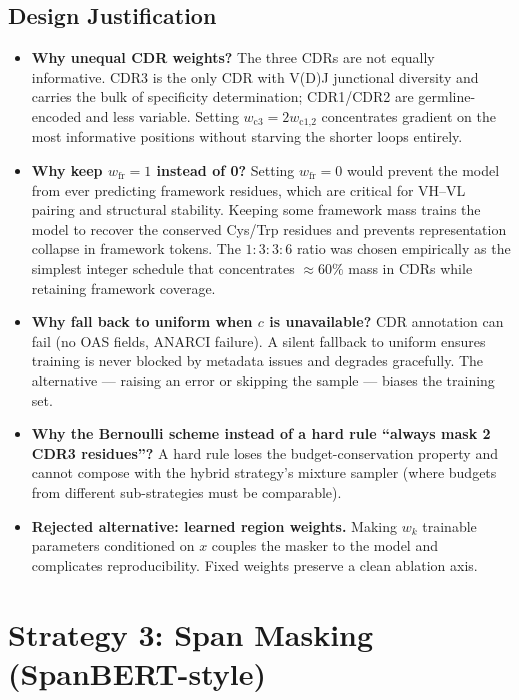 \documentclass[11pt]{article}
\begin{document}
\subsection{Design Justification}
\begin{itemize}
\item \textbf{Why unequal CDR weights?} The three CDRs are not equally
informative. CDR3 is the only CDR with V(D)J junctional diversity and
carries the bulk of specificity determination; CDR1/CDR2 are
germline-encoded and less variable. Setting $w_{\text{c3}} = 2 w_{\text{c1,2}}$
concentrates gradient on the most informative positions without
starving the shorter loops entirely.
\item \textbf{Why keep $w_{\text{fr}} = 1$ instead of 0?} Setting
$w_{\text{fr}} = 0$ would prevent the model from ever predicting
framework residues, which are critical for VH--VL pairing and
structural stability. Keeping some framework mass trains the model to
recover the conserved Cys/Trp residues and prevents representation
collapse in framework tokens. The $1{:}3{:}3{:}6$ ratio was chosen
empirically as the simplest integer schedule that concentrates
$\approx 60\%$ mass in CDRs while retaining framework coverage.
\item \textbf{Why fall back to uniform when $c$ is unavailable?} CDR
annotation can fail (no OAS fields, ANARCI failure). A silent fallback
to uniform ensures training is never blocked by metadata issues and
degrades gracefully. The alternative --- raising an error or skipping
the sample --- biases the training set.
\item \textbf{Why the Bernoulli scheme instead of a hard rule
``always mask 2 CDR3 residues''?} A hard rule loses the
budget-conservation property and cannot compose with the hybrid
strategy's mixture sampler (where budgets from different sub-strategies
must be comparable).
\item \textbf{Rejected alternative: learned region weights.} Making
$w_k$ trainable parameters conditioned on $x$ couples the masker to the
model and complicates reproducibility. Fixed weights preserve a clean
ablation axis.
\end{itemize}

\section{Strategy 3: Span Masking (SpanBERT-style)}
\end{document}
